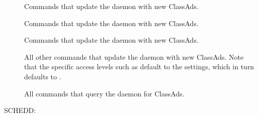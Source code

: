 \begin{description}

\item[]
Commands that update the  daemon with new  ClassAds.

\item[]
Commands that update the  daemon with new  ClassAds.

\item[]
Commands that update the  daemon with new  ClassAds.

\item[]
All other commands that update the  daemon with new
ClassAds.  Note that the specific access levels such as
 default to the  settings,
which in turn defaults to .

\item[]
All commands that query the  daemon for ClassAds.
\end{description}

SCHEDD: 

